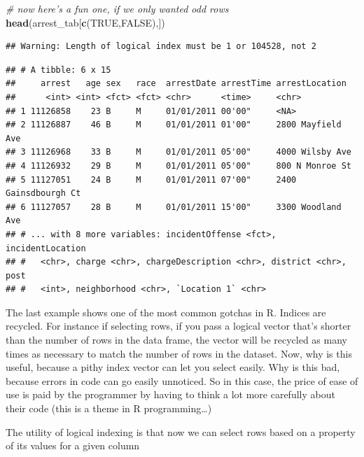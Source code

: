 \documentclass[12pt,]{book}
\newenvironment{Shaded}{\begin{snugshade}}{\end{snugshade}}
\newcommand{\KeywordTok}[1]{\textcolor[rgb]{0.13,0.29,0.53}{\textbf{#1}}}
\newcommand{\DecValTok}[1]{\textcolor[rgb]{0.00,0.00,0.81}{#1}}
\newcommand{\StringTok}[1]{\textcolor[rgb]{0.31,0.60,0.02}{#1}}
\newcommand{\CommentTok}[1]{\textcolor[rgb]{0.56,0.35,0.01}{\textit{#1}}}
\newcommand{\OtherTok}[1]{\textcolor[rgb]{0.56,0.35,0.01}{#1}}
\newcommand{\OperatorTok}[1]{\textcolor[rgb]{0.81,0.36,0.00}{\textbf{#1}}}
\newcommand{\NormalTok}[1]{#1}
\theoremstyle{definition}
\theoremstyle{definition}
\theoremstyle{definition}
\theoremstyle{remark}
\begin{document}
\begin{Shaded}
\begin{Highlighting}[]
\CommentTok{# now here's a fun one, if we only wanted odd rows}
\KeywordTok{head}\NormalTok{(arrest_tab[}\KeywordTok{c}\NormalTok{(}\OtherTok{TRUE}\NormalTok{,}\OtherTok{FALSE}\NormalTok{),])}
\end{Highlighting}
\end{Shaded}

\begin{verbatim}
## Warning: Length of logical index must be 1 or 104528, not 2
\end{verbatim}

\begin{verbatim}
## # A tibble: 6 x 15
##     arrest   age sex   race  arrestDate arrestTime arrestLocation      
##      <int> <int> <fct> <fct> <chr>      <time>     <chr>               
## 1 11126858    23 B     M     01/01/2011 00'00"     <NA>                
## 2 11126887    46 B     M     01/01/2011 01'00"     2800 Mayfield Ave   
## 3 11126968    33 B     M     01/01/2011 05'00"     4000 Wilsby Ave     
## 4 11126932    29 B     M     01/01/2011 05'00"     800 N Monroe St     
## 5 11127051    24 B     M     01/01/2011 07'00"     2400 Gainsdbourgh Ct
## 6 11127057    28 B     M     01/01/2011 15'00"     3300 Woodland Ave   
## # ... with 8 more variables: incidentOffense <fct>, incidentLocation
## #   <chr>, charge <chr>, chargeDescription <chr>, district <chr>, post
## #   <int>, neighborhood <chr>, `Location 1` <chr>
\end{verbatim}

The last example shows one of the most common gotchas in R. Indices are
recycled. For instance if selecting rows, if you pass a logical vector
that's shorter than the number of rows in the data frame, the vector
will be recycled as many times as necessary to match the number of rows
in the dataset. Now, why is this useful, because a pithy index vector
can let you select easily. Why is this bad, because errors in code can
go easily unnoticed. So in this case, the price of ease of use is paid
by the programmer by having to think a lot more carefully about their
code (this is a theme in R programming\ldots{})

The utility of logical indexing is that now we can select rows based on
a property of its values for a given column

\begin{Shaded}
\end{Shaded}
\end{document}
